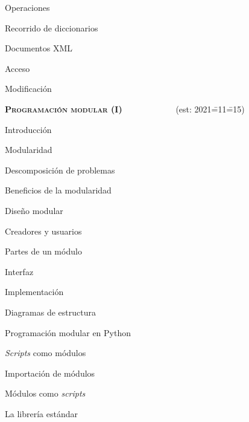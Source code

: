\begin{longenum}
\begin{longenum}
\begin{longenum}
\begin{longenum}
                \item Operaciones
                \item Recorrido de diccionarios
            \end{longenum}
            \item Documentos XML
            \begin{longenum}
                \item Acceso
                \item Modificación
            \end{longenum}
        \end{longenum}
    \end{longenum}
    \item \textbf{\textsc{Programación modular (I)}} \ \ \ \ \ \ \ \ \ \ \ \ (est: 2021\==11\==15)
    \begin{longenum}
        \item Introducción
        \begin{longenum}
            \item Modularidad
            \item Descomposición de problemas
            \item Beneficios de la modularidad
        \end{longenum}
        \item Diseño modular
        \begin{longenum}
            \item Creadores y usuarios
            \item Partes de un módulo
            \begin{longenum}
                \item Interfaz
                \item Implementación
            \end{longenum}
            \item Diagramas de estructura
        \end{longenum}
        \item Programación modular en Python
        \begin{longenum}
            \item \textit{Scripts} como módulos
            \item Importación de módulos
            \item Módulos como \textit{scripts}
            \item La librería estándar

\end{longenum}
\end{longenum}
\end{longenum}
